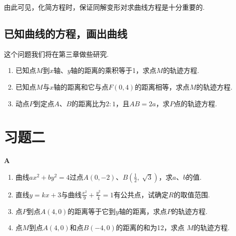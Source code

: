 \begin{figure}[htp]
    \centering
{}
    \caption{}
\end{figure}

由此可见，化简方程时，保证同解变形对求曲线方程是十分重要的.

\subsection{已知曲线的方程，画出曲线}
这个问题我们将在第三章做些研究.


\begin{ex}
\begin{enumerate}
    \item 已知点$M$到$x$轴、$y$轴的距离的乘积等于1，求点$M$的轨迹方程.
    \item  已知点$M$与$x$轴的距离和它与点$F(0,4)$的距离相等，求点$M$的轨迹方程.
    \item  动点$P$到定点$A$、$B$的距离比为$2:1$，且$AB=2a$，求$P$点的轨迹方程.
\end{enumerate}    
\end{ex}

\section*{习题二}
\begin{center}
    \bfseries A
\end{center}

\begin{enumerate}
    \item 曲线$ax^2+by^2=4$过点$A(0,-2)$、$B\left(\frac{1}{2},\; \sqrt{3}\right)$，求$a$、$b$的值.
    \item 直线$y=kx+3$与曲线$\frac{x^2}{9}+\frac{y^2}{4}=1$有公共点，试确定$R$的取值范围.
    \item 点$P$到点$A(4,0)$的距离等于它到$y$轴的距离，求点$P$的轨迹方程.
    \item 点$M$到点$A(4,0)$和点$B(-4,0)$的距离的和为12，求点
    $M$的轨迹方程.
\end{enumerate}

